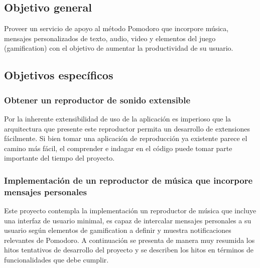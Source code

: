 \documentclass[12pt,letterpaper]{report}
\begin{document}
\hypertarget{objetivo-general}{%
\subsection{Objetivo general}\label{objetivo-general}}

Proveer un servicio de apoyo al método Pomodoro que incorpore música, mensajes
personalizados de texto, audio, video y elementos del juego (gamification) con
el objetivo de aumentar la productividad de su usuario.

\hypertarget{objetivos-especuxedficos}{%
\subsection{Objetivos específicos}\label{objetivos-especuxedficos}}

\hypertarget{obtener-un-reproductor-de-muxfasica-extensible}{%
\subsubsection{Obtener un reproductor de sonido
extensible}\label{obtener-un-reproductor-de-sonido-extensible}}

Por la inherente extensibilidad de uso de la aplicación es imperioso que
la arquitectura que presente este reproductor permita un desarrollo de
extensiones fácilmente. Si bien tomar una aplicación de reproducción ya
existente parece el camino más fácil, el comprender e indagar en el
código puede tomar parte importante del tiempo del proyecto.

\hypertarget{implementaciuxf3n-de-un-reproductor-de-muxfasica-que-incorpore-mensajes-personales}{%
\subsubsection{Implementación de un reproductor de música que incorpore
mensajes
personales}\label{implementaciuxf3n-de-un-reproductor-de-muxfasica-que-incorpore-mensajes-dirigidos}}

Este proyecto contempla la implementación un reproductor de música que
incluye una interfaz de usuario minimal, es capaz de intercalar mensajes
personales a su usuario según elementos de gamification a definir y
muestra notificaciones relevantes de Pomodoro. A continuación se
presenta de manera muy resumida los hitos tentativos de desarrollo del
proyecto y se describen los hitos en términos de funcionalidades que
debe cumplir.
\end{document}
